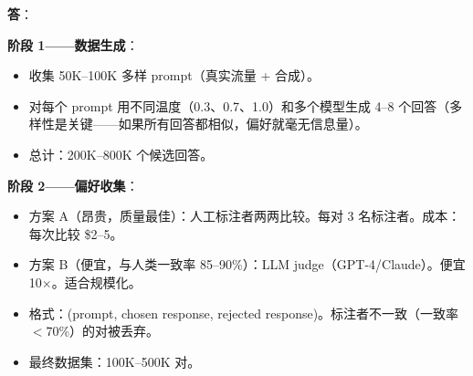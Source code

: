 \begin{questionbox}
\textbf{答}：

\textbf{阶段 1——数据生成}：

\begin{itemize}
  \item 收集 50K--100K 多样 prompt（真实流量 + 合成）。
  \item 对每个 prompt 用不同温度（0.3、0.7、1.0）和多个模型生成 4--8 个回答（多样性是关键——如果所有回答都相似，偏好就毫无信息量）。
  \item 总计：200K--800K 个候选回答。
\end{itemize}

\textbf{阶段 2——偏好收集}：

\begin{itemize}
  \item 方案 A（昂贵，质量最佳）：人工标注者两两比较。每对 3 名标注者。成本：每次比较 \$2--5。
  \item 方案 B（便宜，与人类一致率 85--90\%）：LLM judge（GPT-4/Claude）。便宜 10$\times$。适合规模化。
  \item 格式：(prompt, chosen response, rejected response)。标注者不一致（一致率 $<$70\%）的对被丢弃。
  \item 最终数据集：100K--500K 对。
\end{itemize}


\end{questionbox}
